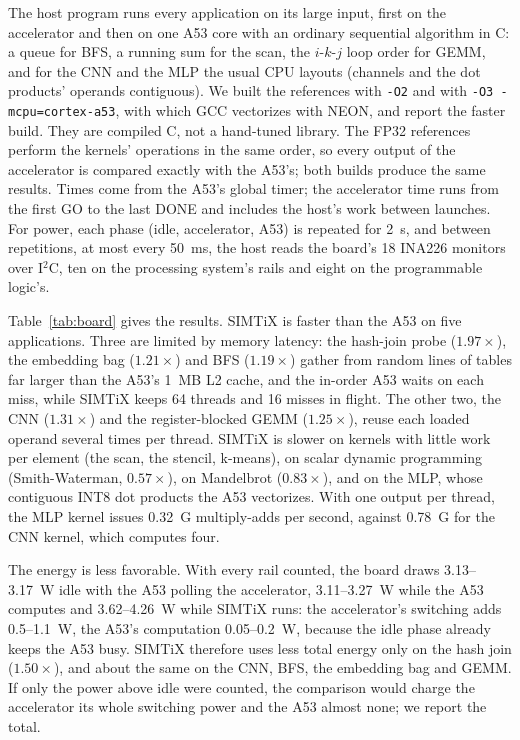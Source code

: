 \documentclass[journal]{IEEEtran}
\begin{document}
The host program runs every application on its large input, first on the
accelerator and then on one A53 core with an ordinary sequential algorithm in C: a
queue for BFS, a running sum for the scan, the $i$-$k$-$j$ loop order for GEMM, and
for the CNN and the MLP the usual CPU layouts (channels and the dot products'
operands contiguous). We built the references with \texttt{-O2} and with
\texttt{-O3 -mcpu=cortex-a53}, with which GCC vectorizes with NEON, and report the
faster build. They are compiled C, not a hand-tuned library. The FP32 references
perform the kernels' operations in the same order, so every output of the
accelerator is compared exactly with the A53's; both builds produce the same
results. Times come from the A53's global timer; the accelerator time runs from
the first GO to the last DONE and includes the host's work between launches. For
power, each phase (idle, accelerator, A53) is repeated for 2~s, and between
repetitions, at most every 50~ms, the host reads the board's 18 INA226 monitors
over I$^2$C, ten on the processing system's rails and eight on the programmable
logic's.

Table~\ref{tab:board} gives the results. SIMTiX is faster than the A53 on five
applications. Three are limited by memory latency: the hash-join probe ($1.97\times$),
the embedding bag ($1.21\times$) and BFS ($1.19\times$) gather from random lines of
tables far larger than the A53's 1~MB L2 cache, and the in-order A53 waits on each
miss, while SIMTiX keeps 64 threads and 16 misses in flight. The other two, the CNN
($1.31\times$) and the register-blocked GEMM ($1.25\times$), reuse each loaded
operand several times per thread. SIMTiX is slower on kernels with little work per
element (the scan, the stencil, k-means), on scalar dynamic programming
(Smith-Waterman, $0.57\times$), on Mandelbrot ($0.83\times$), and on the MLP, whose
contiguous INT8 dot products the A53 vectorizes. With one output per thread, the
MLP kernel issues 0.32~G multiply-adds per second, against 0.78~G for the CNN
kernel, which computes four.

The energy is less favorable. With every rail counted, the board draws
3.13--3.17~W idle with the A53 polling the accelerator, 3.11--3.27~W while the A53
computes and 3.62--4.26~W while SIMTiX runs: the accelerator's switching adds
0.5--1.1~W, the A53's computation 0.05--0.2~W, because the idle phase already keeps
the A53 busy. SIMTiX therefore uses less total energy only on the hash join
($1.50\times$), and about the same on the CNN, BFS, the embedding bag and GEMM. If
only the power above idle were counted, the comparison would charge the accelerator
its whole switching power and the A53 almost none; we report the total.
\end{document}
